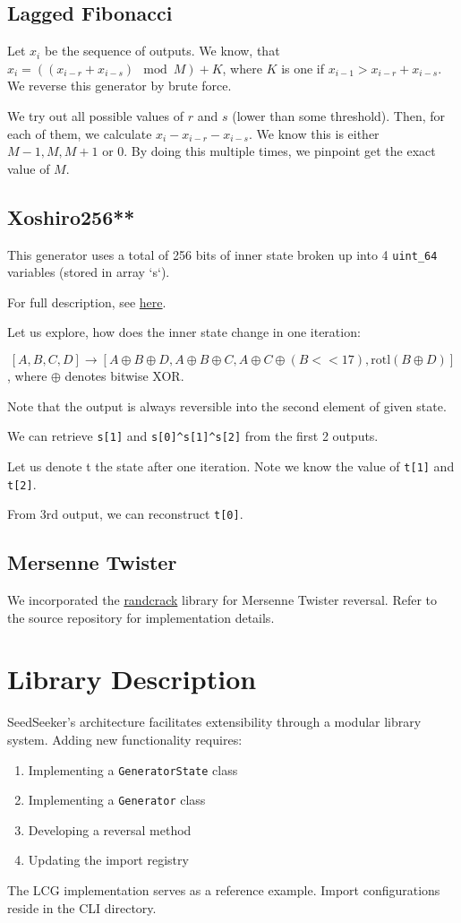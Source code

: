 \documentclass[12pt, a4paper]{report}
\begin{document}
\section{Lagged Fibonacci}
Let $x_i$ be the sequence of outputs. We know, that $x_{i} = ((x_{i-r} + x_{i-s}) \mod M) + K$, where $K$ is one if $x_{i-1} > x_{i-r} + x_{i-s}$.
We reverse this generator by brute force.

We try out all possible values of $r$ and $s$ (lower than some threshold). Then, for each of them, we calculate $x_{i} - x_{i-r} - x_{i-s}$. We know this is either $M-1, M, M+1$ or $0$. By doing this multiple times, we pinpoint get the exact value of $M$.

\section{Xoshiro256**}
This generator uses a total of 256 bits of inner state broken up into 4 \verb|uint_64| variables (stored in array `s`).

For full description, see \href{https://en.m.wikipedia.org/wiki/Xorshift#xoshiro256**}{here}.

Let us explore, how does the inner state change in one iteration:

$$[A, B, C, D] \to [A\oplus B\oplus D, A\oplus B \oplus C, A\oplus C\oplus (B<<17), \text{rotl}(B\oplus D)]$$
, where $\oplus$ denotes bitwise XOR.

Note that the output is always reversible into the second element of given state.

We can retrieve \verb|s[1]| and \verb|s[0]^s[1]^s[2]| from the first 2 outputs.

Let us denote t the state after one iteration. Note we know the value of \verb|t[1]| and \verb|t[2]|.

From 3rd output, we can reconstruct \verb|t[0]|.
\section{Mersenne Twister}
We incorporated the \href{https://github.com/tna0y/Python-random-module-cracker}{randcrack} library for Mersenne Twister reversal. Refer to the source repository for implementation details.

\chapter{Library Description}
SeedSeeker's architecture facilitates extensibility through a modular library system. Adding new functionality requires:

\begin{enumerate}
    \item Implementing a \texttt{GeneratorState} class
    \item Implementing a \texttt{Generator} class
    \item Developing a reversal method
    \item Updating the import registry
\end{enumerate}

The LCG implementation serves as a reference example. Import configurations reside in the CLI directory.
\end{document}
